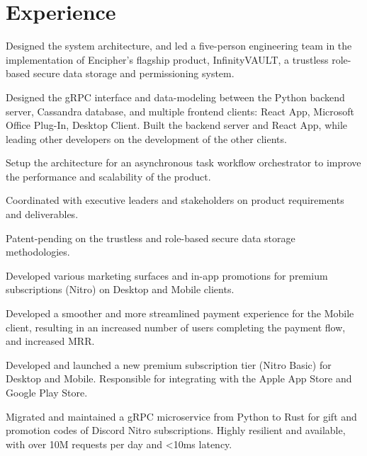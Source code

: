 \documentclass[letterpaper]{deedy-resume-openfont} %
\begin{document}
\begin{minipage}[t]{0.73\textwidth} %


\section{Experience}
\sectionheadersep

\sectionsep

\begin{tightemize}
\item Designed the system architecture, and led a five-person engineering team in the implementation of Encipher's flagship product, InfinityVAULT, a trustless role-based secure data storage and permissioning system.
\item Designed the gRPC interface and data-modeling between the Python backend server, Cassandra database, and multiple frontend clients: React App, Microsoft Office Plug-In, Desktop Client. Built the backend server and React App, while leading other developers on the development of the other clients.
\item Setup the architecture for an asynchronous task workflow orchestrator to improve the performance and scalability of the product.
\item Coordinated with executive leaders and stakeholders on product requirements and deliverables.
\item Patent-pending on the trustless and role-based secure data storage methodologies.
\end{tightemize}

\sectionsep %


\begin{tightemize}
\item Developed various marketing surfaces and in-app promotions for premium subscriptions (Nitro) on Desktop and Mobile clients.
\item Developed a smoother and more streamlined payment experience for the Mobile client, resulting in an increased number of users completing the payment flow, and increased MRR.
\item Developed and launched a new premium subscription tier (Nitro Basic) for Desktop and Mobile. Responsible for integrating with the Apple App Store and Google Play Store. 
\item Migrated and maintained a gRPC microservice from Python to Rust for gift and promotion codes of Discord Nitro subscriptions. Highly resilient and available, with over 10M requests per day and <10ms latency.
\end{tightemize}


\end{minipage}
\end{document}
